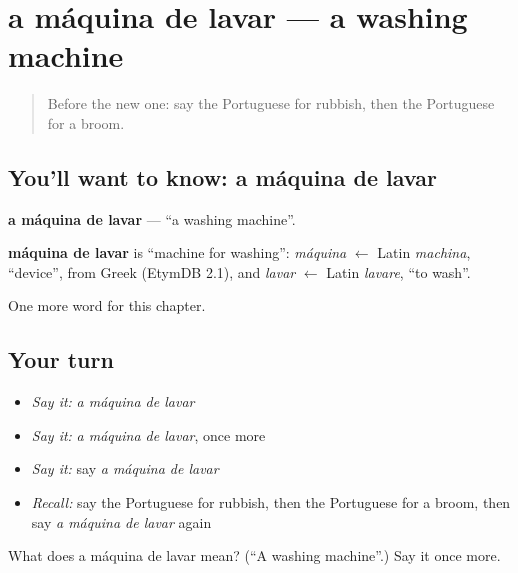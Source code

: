 \section[a máquina de lavar]{a máquina de lavar — a washing machine}

\label{lesson:PT-C96-maquina-de-lavar}



\begin{quote}
Before the new one: say the Portuguese for rubbish, then the Portuguese for a broom.
\end{quote}

\subsection*{You'll want to know: a máquina de lavar}
\textbf{a máquina de lavar} — \textquotedblleft{}a washing machine\textquotedblright{}.

\begin{cousinweb}
\textbf{máquina de lavar} is \textquotedblleft{}machine for washing\textquotedblright{}: \emph{máquina} $\leftarrow$ Latin \emph{machina}, \textquotedblleft{}device\textquotedblright{}, from Greek (EtymDB 2.1), and \emph{lavar} $\leftarrow$ Latin \emph{lavare}, \textquotedblleft{}to wash\textquotedblright{}.
\end{cousinweb}

\begin{grammarlens}[title={What you've built}]
One more word for this chapter.
\end{grammarlens}

\subsection*{Your turn}
\begin{itemize}
\raggedright
  \item \emph{Say it:} \emph{a máquina de lavar}
  \item \emph{Say it:} \emph{a máquina de lavar}, once more
  \item \emph{Say it:} say \emph{a máquina de lavar}
  \item \emph{Recall:} say the Portuguese for rubbish, then the Portuguese for a broom, then say \emph{a máquina de lavar} again
\end{itemize}

\begin{tcolorbox}[breakable,colback=teal!4,colframe=teal!35!black,title={Before you move on}]
What does a máquina de lavar mean? (\textquotedblleft{}A washing machine\textquotedblright{}.) Say it once more.
\end{tcolorbox}
